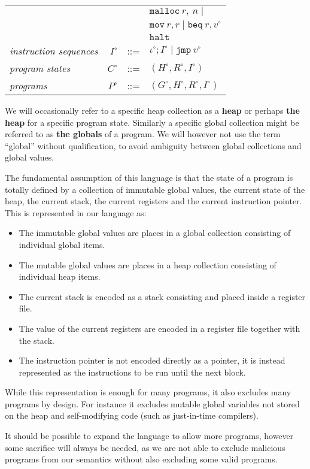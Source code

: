 \begin{tabular}{lrcl}
        &&& $\mathtt{malloc}\ r,\ n \mid $ \\
        &&& $\mathtt{mov}\ r, r \mid \mathtt{beq}\ r, v^\circ$ \\
        &&& $\mathtt{halt}$ \\
\textit{instruction sequences} & $I^\circ$ & ::= & $\iota^\circ ; I^\circ \mid \mathtt{jmp}\ v^\circ$ \\
\textit{program states} & $C^\circ$ & ::= & $(H^\circ, R^\circ, I^\circ)$ \\
\textit{programs} & $P^\circ$ & ::= & $(G^\circ, H^\circ, R^\circ, I^\circ)$ \\
\end{tabular}

We will occasionally refer to a specific heap collection as a \textbf{heap} or
perhaps \textbf{the heap} for a specific program state. Similarly a specific
global collection might be referred to as \textbf{the globals} of a program. We
will however not use the term ``global'' without qualification, to avoid
ambiguity between global collections and global values.

The fundamental assumption of this language is that the state of a program is
totally defined by a collection of immutable global values, the current state of
the heap, the current stack, the current registers and the current instruction
pointer. This is represented in our language as:

\begin{itemize}
\item The immutable global values are places in a global collection
  consisting of individual global items.
\item The mutable global values are places in a heap collection
  consisting of individual heap items.
\item The current stack is encoded as a stack consisting and placed inside a
  register file.
\item The value of the current registers are encoded in a register file together
  with the stack.
\item The instruction pointer is not encoded directly as a pointer, it is
  instead represented as the instructions to be run until the next block.
\end{itemize}

While this representation is enough for many programs, it also excludes many
programs by design. For instance it excludes mutable global variables not stored
on the heap and self-modifying code (such as just-in-time compilers).

It should be possible to expand the language to allow more programs, however
some sacrifice will always be needed, as we are not able to exclude malicious
programs from our semantics without also excluding some valid programs.
